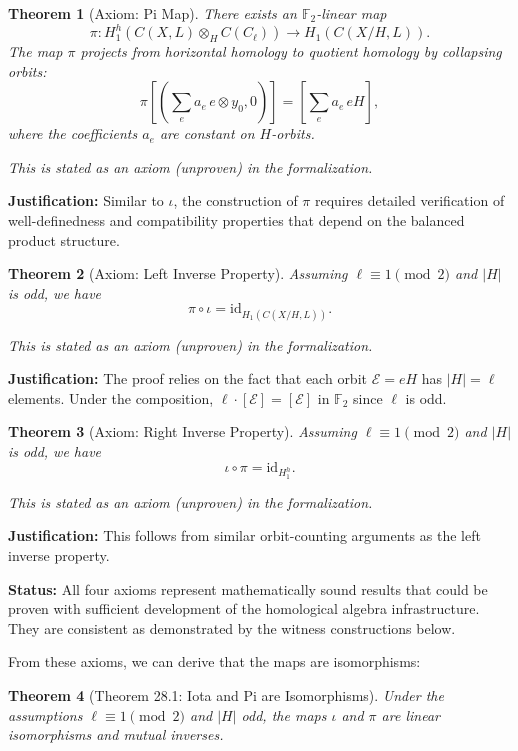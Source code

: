 \documentclass[11pt]{article}
\theoremstyle{plain}
\newtheorem*{theorem}{Theorem}
\theoremstyle{definition}
\theoremstyle{remark}
\begin{document}
\begin{theorem}[Axiom: Pi Map]
There exists an $\mathbb{F}_2$-linear map
\[
\pi : H_1^h(C(X,L) \otimes_H C(C_\ell)) \to H_1(C(X/H, L)).
\]
The map $\pi$ projects from horizontal homology to quotient homology by collapsing orbits:
\[
\pi\!\left[\left(\sum_e a_e\, e \otimes y_0, 0\right)\right] = \left[\sum_e a_e\, eH\right],
\]
where the coefficients $a_e$ are constant on $H$-orbits.

\textit{This is stated as an axiom (unproven) in the formalization.}
\end{theorem}

\textbf{Justification:} Similar to $\iota$, the construction of $\pi$ requires detailed verification of well-definedness and compatibility properties that depend on the balanced product structure.

\begin{theorem}[Axiom: Left Inverse Property]
Assuming $\ell \equiv 1 \pmod{2}$ and $|H|$ is odd, we have
\[
\pi \circ \iota = \mathrm{id}_{H_1(C(X/H,L))}.
\]

\textit{This is stated as an axiom (unproven) in the formalization.}
\end{theorem}

\textbf{Justification:} The proof relies on the fact that each orbit $\mathcal{E} = eH$ has $|H| = \ell$ elements. Under the composition, $\ell \cdot [\mathcal{E}] = [\mathcal{E}]$ in $\mathbb{F}_2$ since $\ell$ is odd.

\begin{theorem}[Axiom: Right Inverse Property]
Assuming $\ell \equiv 1 \pmod{2}$ and $|H|$ is odd, we have
\[
\iota \circ \pi = \mathrm{id}_{H_1^h}.
\]

\textit{This is stated as an axiom (unproven) in the formalization.}
\end{theorem}

\textbf{Justification:} This follows from similar orbit-counting arguments as the left inverse property.

\textbf{Status:} All four axioms represent mathematically sound results that could be proven with sufficient development of the homological algebra infrastructure. They are consistent as demonstrated by the witness constructions below.

From these axioms, we can derive that the maps are isomorphisms:

\begin{theorem}[Theorem 28.1: Iota and Pi are Isomorphisms]
Under the assumptions $\ell \equiv 1 \pmod{2}$ and $|H|$ odd, the maps $\iota$ and $\pi$ are linear isomorphisms and mutual inverses.
\end{theorem}
\end{document}
